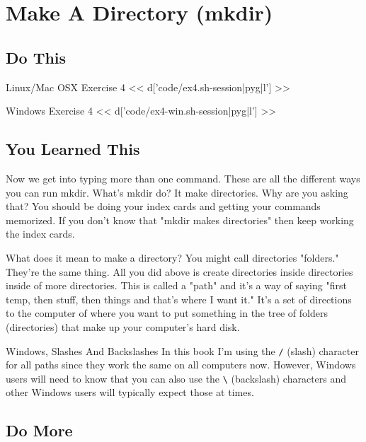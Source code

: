 \chapter{Make A Directory (mkdir)}

\section{Do This}

\begin{code}{Linux/Mac OSX Exercise 4}
<< d['code/ex4.sh-session|pyg|l'] >>
\end{code}

\begin{code}{Windows Exercise 4}
<< d['code/ex4-win.sh-session|pyg|l'] >>
\end{code}

\section{You Learned This}

Now we get into typing more than one command.  These are all the different ways
you can run mkdir.  What's mkdir do?  It make directories.  Why are you asking
that?  You should be doing your index cards and getting your commands memorized.
If you don't know that "mkdir makes directories" then keep working the index
cards.

What does it mean to make a directory?  You might call directories "folders."  They're
the same thing.  All you did above is create directories inside directories
inside of more directories.  This is called a "path" and it's a way of saying
"first temp, then stuff, then things and that's where I want it."  It's a
set of directions to the computer of where you want to put something in the tree
of folders (directories) that make up your computer's hard disk.


\begin{aside}{Windows, Slashes And Backslashes}
In this book I'm using the \verb|/| (slash) character for all paths since they work
the same on all computers now.  However, Windows users will need to know that you can
also use the \verb|\| (backslash) characters and other Windows users will typically
expect those at times.
\end{aside}

\section{Do More}

